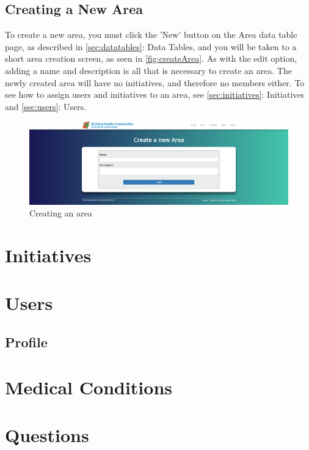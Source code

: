 \documentclass{bhcguides}
\begin{document}
\subsection{Creating a New Area}
\label{ssec:createArea}

To create a new area, you must click the 'New' button on the Area data table page, as described in \autoref{sec:datatables}: Data Tables, and you will be taken to a short area creation screen, as seen in \autoref{fig:createArea}. As with the edit option, adding a name and description is all that is necessary to create an area. The newly created area will have no initiatives, and therefore no members either. To see how to assign users and initiatives to an area, see \autoref{sec:initiatives}: Initiatives and \autoref{sec:users}: Users.

\begin{figure}[h!]
 \centerline{\includegraphics[width=\textwidth, height=\textheight, keepaspectratio]{createarea.png}}
 \caption{Creating an area}
 \label{fig:createArea}
\end{figure}

\section{Initiatives}
\label{sec:initiatives}

\section{Users}
\label{sec:users}

\subsection{Profile}
\label{ssec:profile}

\section{Medical Conditions}
\label{sec:medical}

\section{Questions}
\label{sec:questions}
\end{document}
